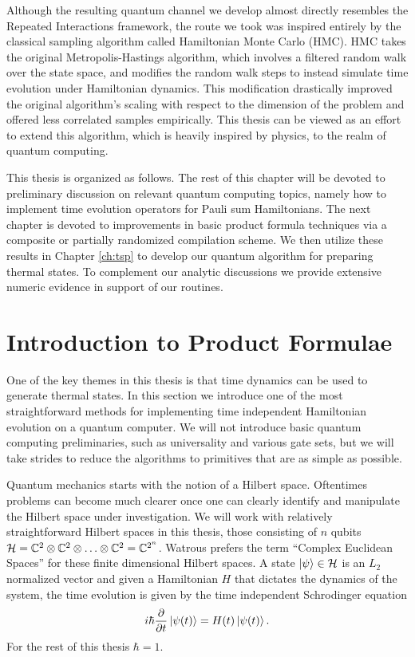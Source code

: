 Although the resulting quantum channel we develop almost directly resembles the Repeated Interactions framework, the route we took was inspired entirely by the classical sampling algorithm called Hamiltonian Monte Carlo (HMC). HMC takes the original Metropolis-Hastings algorithm, which involves a filtered random walk over the state space, and modifies the random walk steps to instead simulate time evolution under Hamiltonian dynamics. This modification drastically improved the original algorithm's scaling with respect to the dimension of the problem and offered less correlated samples empirically. This thesis can be viewed as an effort to extend this algorithm, which is heavily inspired by physics, to the realm of quantum computing. 

This thesis is organized as follows. The rest of this chapter will be devoted to preliminary discussion on relevant quantum computing topics, namely how to implement time evolution operators for Pauli sum Hamiltonians. The next chapter is devoted to improvements in basic product formula techniques via a composite or partially randomized compilation scheme. We then utilize these results in Chapter \ref{ch:tsp} to develop our quantum algorithm for preparing thermal states. To complement our analytic discussions we provide extensive numeric evidence in support of our routines. 

\section{Introduction to Product Formulae}
One of the key themes in this thesis is that time dynamics can be used to generate thermal states. In this section we introduce one of the most straightforward methods for implementing time independent Hamiltonian evolution on a quantum computer. We will not introduce basic quantum computing preliminaries, such as universality and various gate sets, but we will take strides to reduce the algorithms to primitives that are as simple as possible. 

Quantum mechanics starts with the notion of a Hilbert space. Oftentimes problems can become much clearer once one can clearly identify and manipulate the Hilbert space under investigation. We will work with relatively straightforward Hilbert spaces in this thesis, those consisting of $n$ qubits $\mathcal{H} = \mathbb{C}^{2} \otimes \mathbb{C}^2 \otimes \ldots \otimes \mathbb{C}^2 = \mathbb{C}^{2^n}$. Watrous prefers the term ``Complex Euclidean Spaces'' for these finite dimensional Hilbert spaces. A state $\ket{\psi} \in \mathcal{H}$ is an $L_2$ normalized vector and given a Hamiltonian $H$ that dictates the dynamics of the system, the time evolution is given by the time independent Schrodinger equation
\begin{equation}
    i \hbar \frac{\partial}{\partial t} \ket{\psi(t)} = H(t) \ket{\psi(t)}.
\end{equation}
For the rest of this thesis $\hbar = 1$. 

